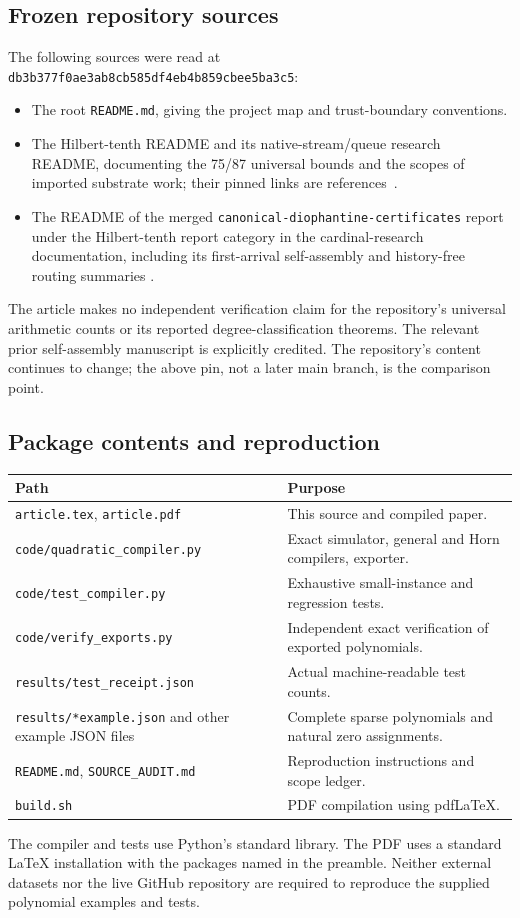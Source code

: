 \documentclass[11pt,letterpaper]{article}
\theoremstyle{definition}
\theoremstyle{remark}
\newcommand{\pin}{\texttt{db3b377f0ae3ab8cb585df4eb4b859cbee5ba3c5}}
\newcommand{\code}[1]{\nolinkurl{#1}}
\begin{document}
\subsection{Frozen repository sources}
The following sources were read at \pin:
\begin{itemize}
\item The root \code{README.md}, giving the project map and trust-boundary
conventions.
\item The Hilbert-tenth README and its native-stream/queue research README,
documenting the 75/87 universal bounds and the scopes of imported substrate
work; their pinned links are references~\cite{ts:repo-h10,ts:repo-native}.
\item The README of the merged
\code{canonical-diophantine-certificates} report under
the Hilbert-tenth report category in the cardinal-research documentation,
including its first-arrival self-assembly and history-free routing summaries
\cite{ts:repo-canonical}.
\end{itemize}
The article makes no independent verification claim for the repository's
universal arithmetic counts or its reported degree-classification theorems.
The relevant prior self-assembly manuscript is explicitly credited. The
repository's content continues to change; the above pin, not a later main
branch, is the comparison point.

\subsection{Package contents and reproduction}
\begin{center}\small
\begin{tabular}{p{}p{}}
\toprule
Path & Purpose\\\midrule
\code{article.tex}, \code{article.pdf} & This source and compiled paper.\\
\code{code/quadratic_compiler.py} & Exact simulator, general and Horn compilers, exporter.\\
\code{code/test_compiler.py} & Exhaustive small-instance and regression tests.\\
\code{code/verify_exports.py} & Independent exact verification of exported polynomials.\\
\code{results/test_receipt.json} & Actual machine-readable test counts.\\
\code{results/*example.json} and other example JSON files & Complete sparse polynomials and natural zero assignments.\\
\code{README.md}, \code{SOURCE_AUDIT.md} & Reproduction instructions and scope ledger.\\
\code{build.sh} & PDF compilation using pdfLaTeX.\\\bottomrule
\end{tabular}
\end{center}
The compiler and tests use Python's standard library. The PDF uses a
standard LaTeX installation with the packages named in the preamble.
Neither external datasets nor the live GitHub repository are required to
reproduce the supplied polynomial examples and tests.
\end{document}
